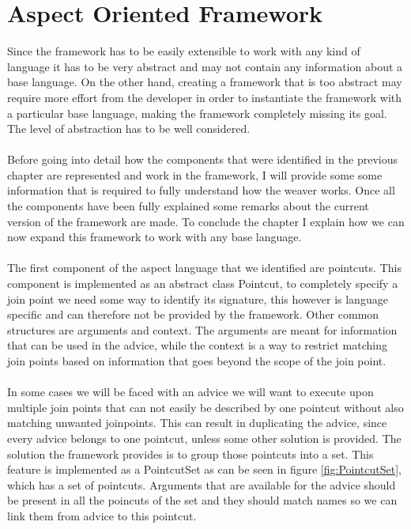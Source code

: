 \documentclass[a4paper]{report}
\begin{document}
\chapter{Aspect Oriented Framework}
Since the framework has to be easily extensible to work with any kind of language it has to be very abstract and may not contain any information about a base language. On the other hand, creating a framework that is too abstract may require more effort from the developer in order to instantiate the framework with a particular base language, making the framework completely missing its goal. The level of abstraction has to be well considered.\\
\\
Before going into detail how the components that were identified in the previous chapter are represented and work in the framework, I will provide some some information that is required to fully understand how the weaver works. Once all the components have been fully explained some remarks about the current version of the framework are made. To conclude the chapter I explain how we can now expand this framework to work with any base language.\\
\\
The first component of the aspect language that we identified are pointcuts. This component is implemented as an abstract class Pointcut, to completely specify a join point we need some way to identify its signature, this however is language specific and can therefore not be provided by the framework. Other common structures are arguments and context. The arguments are meant for information that can be used in the advice, while the context is a way to restrict matching join points based on  information that goes beyond the scope of the join point.\\
\\
In some cases we will be faced with an advice we will want to execute upon multiple join points that can not easily be described by one pointcut without also matching unwanted joinpoints. This can result in duplicating the advice, since every advice belongs to one pointcut, unless some other solution is provided. The solution the framework provides is to group those pointcuts into a set. This feature is implemented as a PointcutSet as can be seen in figure \ref{fig:PointcutSet}, which has a set of pointcuts. Arguments that are available for the advice should be present in all the poincuts of the set and they should match names so we can link them from advice to this pointcut.
\end{document}
